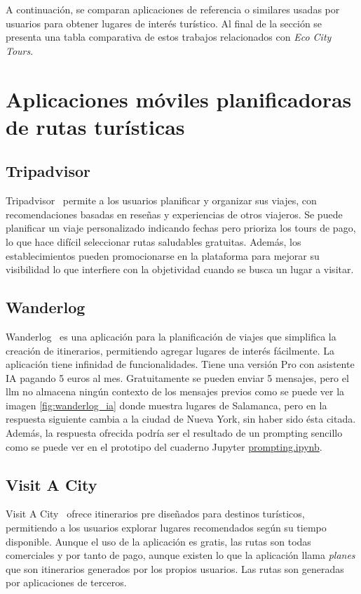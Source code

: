 
A continuación, se comparan aplicaciones de referencia o similares usadas por usuarios para obtener lugares de interés turístico. Al final de la sección se presenta una tabla comparativa de estos trabajos relacionados con \textit{Eco City Tours}.
\section{Aplicaciones móviles planificadoras de rutas turísticas}
\subsection{Tripadvisor}
Tripadvisor~\cite{tripadvisor} permite a los usuarios planificar y organizar sus viajes, con recomendaciones basadas en reseñas y experiencias de otros viajeros. Se puede planificar un viaje personalizado indicando fechas pero prioriza los tours de pago, lo que hace difícil seleccionar rutas saludables gratuitas. Además, los establecimientos pueden promocionarse en la plataforma para mejorar su visibilidad lo que interfiere con la objetividad cuando se busca un lugar a visitar.

\subsection{Wanderlog}
Wanderlog~\cite{wanderlog} es una aplicación para la planificación de viajes que simplifica la creación de itinerarios, permitiendo agregar lugares de interés fácilmente. La aplicación tiene infinidad de funcionalidades. Tiene una versión Pro con asistente IA pagando 5 euros al mes. Gratuitamente se pueden enviar 5 mensajes, pero el \acrshort{llm} no almacena ningún contexto de los mensajes previos como se puede ver la imagen \ref{fig:wanderlog_ia} donde muestra lugares de  Salamanca, pero en la respuesta siguiente cambia a la ciudad de Nueva York, sin haber sido ésta citada. Además, la respuesta ofrecida podría ser el resultado de un prompting sencillo como se puede ver en el prototipo del cuaderno Jupyter \href{https://github.com/fps1001/TFGII_FPisot/tree/main/project-prototypes/prompting.ipynb}{prompting.ipynb}.

\subsection{Visit A City}
Visit A City~\cite{visitacity} ofrece itinerarios pre diseñados para destinos turísticos, permitiendo a los usuarios explorar lugares recomendados según su tiempo disponible. Aunque el uso de la aplicación es gratis, las rutas son todas comerciales y por tanto de pago, aunque existen lo que la aplicación llama \textit{planes} que son itinerarios generados por los propios usuarios. Las rutas son generadas por aplicaciones de terceros.

